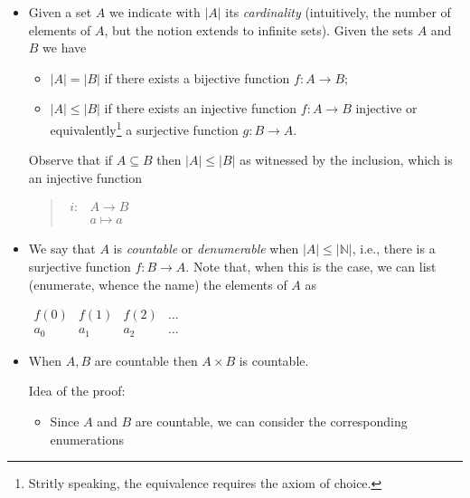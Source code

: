 \documentclass{amsbook}
\newcommand{\nat}{\ensuremath{\mathbb{N}}}
\theoremstyle{definition}
\theoremstyle{remark}
\numberwithin{section}{chapter}
\numberwithin{equation}{chapter}
\begin{document}
\begin{itemize}
\item Given a set $A$ we indicate with $|A|$ its \emph{cardinality}
  (intuitively, the number of elements of $A$, but the notion extends
  to infinite sets). Given the sets $A$ and $B$ we have 
  \begin{itemize}
  \item $|A| = |B|$ if there exists a bijective function $f : A \to B$;
  \item $|A| \leq |B|$ if there exists an injective function
    $f: A \to B$ injective or equivalently\footnote{Stritly speaking,
      the equivalence requires the axiom of choice.} a surjective
    function $g : B \to A$.
  \end{itemize}
  Observe that if $A \subseteq B$ then $|A| \leq |B|$ as witnessed by
  the inclusion, which is an injective function
  \begin{quote}
    $\begin{array}{cc}
      i: & A \to B  \\
         & a \mapsto a
    \end{array}$
  \end{quote}
  
\item We say that $A$ is \emph{countable} or \emph{denumerable} when
  $|A| \leq |\nat|$, i.e., there is a surjective function
  $f: B \to A$. Note that, when this is the case, we can
  list (enumerate, whence the name) the elements of $A$ as
  \begin{center}
    $\begin{array}{cccc}
       f(0) & f(1) & f(2) & \dots\\
       a_0  & a_1  & a_2 & \dots
     \end{array}
     $
  \end{center}

\item When $A, B$ are countable then $A\times B$ is countable.
  
  Idea of the proof:
  \begin{itemize}
  \item Since $A$ and $B$ are countable, we can consider the
    corresponding enumerations
    

\end{itemize}
\end{itemize}
\end{document}
